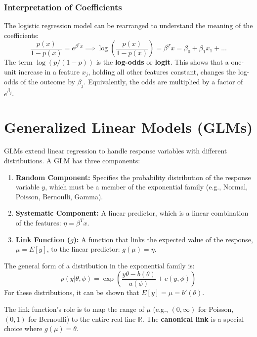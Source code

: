 \documentclass{article}
\begin{document}
\begin{multicols}{2}
\subsubsection{Interpretation of Coefficients}
The logistic regression model can be rearranged to understand the meaning of the coefficients:
$$ \frac{p(x)}{1-p(x)} = e^{\beta^T x} \implies \log\left(\frac{p(x)}{1-p(x)}\right) = \beta^T x = \beta_0 + \beta_1 x_1 + \dots $$
The term $\log(p / (1-p))$ is the \textbf{log-odds} or \textbf{logit}. This shows that a one-unit increase in a feature $x_j$, holding all other features constant, changes the log-odds of the outcome by $\beta_j$. Equivalently, the odds are multiplied by a factor of $e^{\beta_j}$.

\section{Generalized Linear Models (GLMs)}
GLMs extend linear regression to handle response variables with different distributions. A GLM has three components:
\begin{enumerate}
    \item \textbf{Random Component:} Specifies the probability distribution of the response variable $y$, which must be a member of the exponential family (e.g., Normal, Poisson, Bernoulli, Gamma).
    \item \textbf{Systematic Component:} A linear predictor, which is a linear combination of the features: $\eta = \beta^T x$.
    \item \textbf{Link Function ($g$):} A function that links the expected value of the response, $\mu = E[y]$, to the linear predictor: $g(\mu) = \eta$.
\end{enumerate}
The general form of a distribution in the exponential family is:
$$ p(y|\theta, \phi) = \exp\left(\frac{y\theta - b(\theta)}{a(\phi)} + c(y, \phi)\right) $$
For these distributions, it can be shown that $E[y] = \mu = b'(\theta)$.

The link function's role is to map the range of $\mu$ (e.g., $(0, \infty)$ for Poisson, $(0, 1)$ for Bernoulli) to the entire real line $\mathbb{R}$. The \textbf{canonical link} is a special choice where $g(\mu) = \theta$.


\end{multicols}
\end{document}
